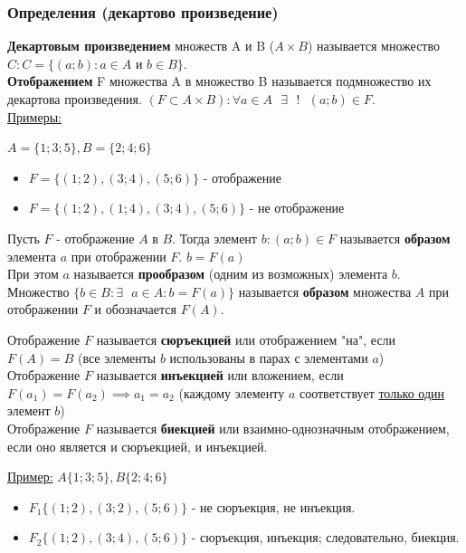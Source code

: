 \documentclass[12pt]{article}
\begin{document}
    \subsubsection*{Определения (декартово произведение)}
    \noindent \textbf{Декартовым произведением} множеств A и B ($A \times B$) называется множество $C : C = \{ (a; b) : a \in A \text{ и } b \in B\}$.\\
    \textbf{Отображением} F множества A в множество B называется подмножество их декартова произведения. $(F \subset A \times B) : \forall a \in A \text{ } \exists \text{ } ! \text{ } (a;b) \in F$.\\
    \underline{Примеры:}\par
    $A = \{1; 3; 5\}, B = \{2; 4; 6\}$
    \begin{itemize}
        \item $F = \{(1;2), (3;4), (5;6)\}$ - отображение
        \item $F = \{(1;2), (1;4), (3;4), (5;6)\}$ - не отображение
    \end{itemize}
    Пусть $F$ - отображение $A$ в $B$. Тогда элемент $b : (a;b) \in F$ называется \textbf{образом} элемента $a$ при отображении $F$. $b = F(a)$\\
    При этом $a$ называется \textbf{прообразом} (одним из возможных) элемента $b$.\\
    Множество $\{b \in B : \exists \text{ } a \in A : b = F(a)\}$ называется \textbf{образом} множества $A$ при отображении $F$ и обозначается $F(A)$.\par
    \noindent Отображение $F$ называется \textbf{сюръекцией} или отображением "на", если $F(A) = B$ (все элементы $b$ использованы в парах с элементами $a$)\\
    Отображение $F$ называется \textbf{инъекцией} или вложением, если $F(a_{1}) = F(a_{2}) \implies a_{1} = a_{2}$ (каждому элементу $a$ соответствует \underline{только один} элемент $b$)\\
    Отображение $F$ называется \textbf{биекцией} или взаимно-однозначным отображением, если оно является и сюръекцией, и инъекцией.\par
    \noindent \underline{Пример:}  $A\{1;3;5\}, B\{2;4;6\}$
    \begin{itemize}
        \item $F_{1}\{(1;2),(3;2),(5;6)\}$ - не сюръекция, не инъекция.
        \item $F_{2}\{(1;2),(3;4),(5;6)\}$ - сюръекция, инъекция; следовательно, биекция.
    \end{itemize}
\end{document}
